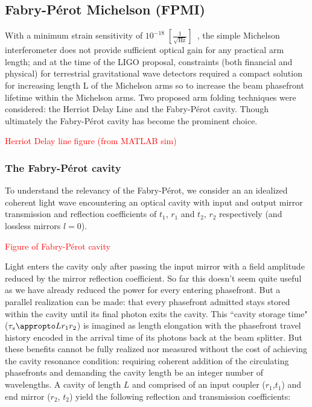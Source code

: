 \subsection{Fabry-P\'{e}rot Michelson (FPMI)}
With a minimum strain sensitivity of $10^{-18} \; [\frac{1}{\sqrt{\mathrm{Hz}}}]$~\cite{}, the simple Michelson interferometer does not provide sufficient optical gain for any practical arm length; and at the time of the LIGO proposal, constraints (both financial and physical) for terrestrial gravitational wave detectors required a compact solution for increasing length L of the Michelson arms so to increase the beam phasefront lifetime within the Michelson arms. Two proposed arm folding techniques were considered: the Herriot Delay Line and the Fabry-P\'{e}rot cavity. Though ultimately the Fabry-P\'{e}rot cavity has become the prominent choice.

\textcolor{red}{Herriot Delay line figure (from MATLAB sim)}


\subsubsection{The Fabry-P\'{e}rot cavity}
\label{section:FPC}
To understand the relevancy of the Fabry-P\'{e}rot, we consider an an idealized coherent light wave encountering an optical cavity with input and output mirror transmission and reflection coefficients of $t_1$, $r_1$ and $t_2$, $r_2$ respectively (and lossless mirrors $l=0$).

\textcolor{red}{Figure of Fabry-P\'{e}rot cavity}


Light enters the cavity only after passing the input mirror with a field amplitude reduced by the mirror reflection coefficient. So far this doesn't seem quite useful as we have already reduced the power for every entering phasefront. But a parallel realization can be made: that every phasefront admitted stays stored within the cavity until its final photon exits the cavity. This ``cavity storage time" ($\tau_s \appropto L r_1r_2$) is imagined as length elongation with the phasefront travel history encoded in the arrival time of its photons back at the beam splitter. But these benefits cannot be fully realized nor measured without the cost of achieving the cavity resonance condition: requiring coherent addition of the circulating phasefronts and demanding the cavity length be an integer number of wavelengths. A cavity of length $L$ and comprised of an input coupler ($r_1$,$t_1$) and end mirror ($r_2$, $t_2$) yield the following reflection and transmission coefficients: 


